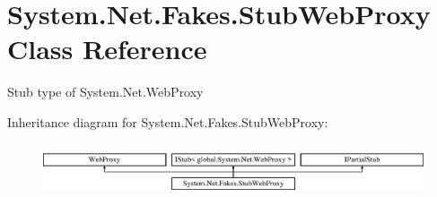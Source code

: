 \hypertarget{class_system_1_1_net_1_1_fakes_1_1_stub_web_proxy}{\section{System.\-Net.\-Fakes.\-Stub\-Web\-Proxy Class Reference}
\label{class_system_1_1_net_1_1_fakes_1_1_stub_web_proxy}
}


Stub type of System.\-Net.\-Web\-Proxy 


Inheritance diagram for System.\-Net.\-Fakes.\-Stub\-Web\-Proxy\-:\begin{figure}[H]
\begin{center}
\leavevmode
\includegraphics[height=1.588652cm]{class_system_1_1_net_1_1_fakes_1_1_stub_web_proxy}
\end{center}
\end{figure}
